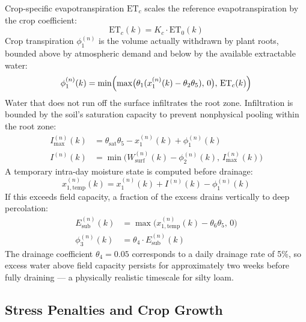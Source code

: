 Crop-specific evapotranspiration $\mathrm{ET}_c$ scales the reference
evapotranspiration by the crop coefficient:
\begin{equation}
\mathrm{ET}_c(k) = K_c \cdot \mathrm{ET}_0(k)
\label{eq:etc}
\end{equation}
Crop transpiration $\phi_1^{(n)}$ is the volume actually withdrawn by
plant roots, bounded above by atmospheric demand and below by the
available extractable water:
\begin{equation}
\phi_1^{(n)}(k) = \min\Bigl(
\max\bigl(\theta_1 (x_1^{(n)}(k) - \theta_2 \theta_5),\, 0\bigr),
\, \mathrm{ET}_c(k)
\Bigr)
\label{eq:phi1}
\end{equation}
Water that does not run off the surface infiltrates the root zone.
Infiltration is bounded by the soil's saturation capacity to prevent
nonphysical pooling within the root zone:
\begin{align}
I_{\max}^{(n)}(k) &= \theta_{\mathrm{sat}} \theta_5
- x_1^{(n)}(k) + \phi_1^{(n)}(k)
\label{eq:imax}\\
I^{(n)}(k) &= \min\bigl(
W_{\mathrm{surf}}^{(n)}(k) - \phi_2^{(n)}(k),\,
I_{\max}^{(n)}(k)
\bigr)
\label{eq:i}
\end{align}
A temporary intra-day moisture state is computed before drainage:
\begin{equation}
x_{1,\mathrm{temp}}^{(n)}(k) = x_1^{(n)}(k) + I^{(n)}(k) - \phi_1^{(n)}(k)
\label{eq:x1temp}
\end{equation}
If this exceeds field capacity, a fraction of the excess drains
vertically to deep percolation:
\begin{align}
E_{\mathrm{sub}}^{(n)}(k) &= \max\bigl(
x_{1,\mathrm{temp}}^{(n)}(k) - \theta_6 \theta_5,\, 0
\bigr)
\label{eq:esub}\\
\phi_3^{(n)}(k) &= \theta_4 \cdot E_{\mathrm{sub}}^{(n)}(k)
\label{eq:phi3}
\end{align}
The drainage coefficient $\theta_4 = 0.05$ corresponds to a daily
drainage rate of 5\%, so excess water above field capacity persists
for approximately two weeks before fully draining --- a physically
realistic timescale for silty loam.

\subsection{Stress Penalties and Crop Growth}
\label{ssec:sys-stress}

